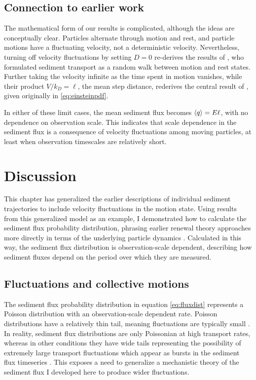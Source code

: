 \subsection{Connection to earlier work}

The mathematical form of our results is complicated, although the ideas are conceptually clear. Particles alternate through motion and rest, and particle motions have a fluctuating velocity, not a deterministic velocity. 
Nevertheless, turning off velocity fluctuations by setting $D=0$ re-derives the results of \citet{Lisle1998}, who formulated sediment transport as a random walk between motion and rest states.
Further taking the velocity infinite as the time spent in motion vanishes, while their product $V/k_D = \ell$, the mean step distance, rederives the central result of \citet{Einstein1937}, given originally in \ref{eq:einsteinpdf}.

In either of these limit cases, the mean sediment flux becomes $\langle q \rangle = E \ell$, with no dependence on observation scale. This indicates that scale dependence in the sediment flux is a consequence of velocity fluctuations among moving particles, at least when observation timescales are relatively short.
 
\section{Discussion \label{sec:disc}}

This chapter has generalized the earlier descriptions of individual sediment trajectories \citep[e.g.][]{Lisle1998,Lajeunesse2018} to include velocity fluctuations in the motion state. Using results from this generalized model as an example, I demonstrated how to calculate the sediment flux probability distribution, phrasing earlier renewal theory approaches more directly in terms of the underlying particle dynamics \citep[e.g.][]{Turowski2010,Ancey2020}. 
Calculated in this way, the sediment flux distribution is observation-scale dependent, describing how sediment fluxes depend on the period over which they are measured.

\subsection{Fluctuations and collective motions}

The sediment flux probability distribution in equation \ref{eq:fluxdist} represents a Poisson distribution with an observation-scale dependent rate.
Poisson distributions have a relatively thin tail, meaning fluctuations are typically small \citep{Ancey2006}.
In reality, sediment flux distributions are only Poissonian at high transport rates, whereas in other conditions they have wide tails representing the possibility of extremely large transport fluctuations \citep{Ancey2008,Turowski2010,Dhont2010,Saletti2015} which appear as bursts \citep[e.g.][]{Goh2008} in the sediment flux timeseries \citep{Singh2009, Heyman2013,Benavides2021}. This exposes a need to generalize a mechanistic theory of the sediment flux I developed here to produce wider fluctuations.

